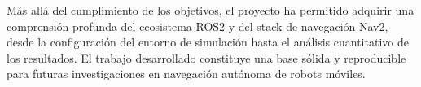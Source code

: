 Más allá del cumplimiento de los objetivos, el proyecto ha permitido adquirir una comprensión profunda del ecosistema ROS2 y del stack de navegación Nav2, desde la configuración del entorno de simulación hasta el análisis cuantitativo de los resultados. El trabajo desarrollado constituye una base sólida y reproducible para futuras investigaciones en navegación autónoma de robots móviles.
